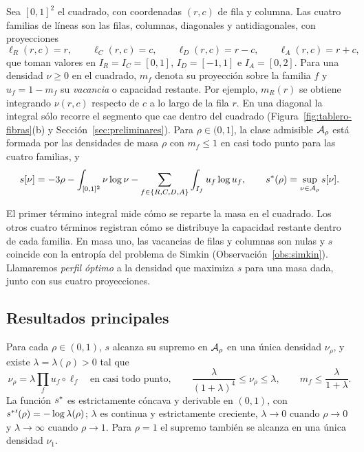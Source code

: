 Sea $[0,1]^2$ el cuadrado, con coordenadas $(r,c)$ de fila y columna. Las cuatro familias de líneas
son las filas, columnas, diagonales y antidiagonales, con proyecciones
\[
 \ell_R(r,c)=r,\qquad \ell_C(r,c)=c,\qquad \ell_D(r,c)=r-c,\qquad \ell_A(r,c)=r+c,
\]
que toman valores en $I_R=I_C=[0,1]$, $I_D=[-1,1]$ e $I_A=[0,2]$. Para una densidad $\nu\ge0$ en
el cuadrado, $m_f$ denota su proyección sobre la familia $f$ y $u_f=1-m_f$ su \emph{vacancia}
o capacidad restante. Por ejemplo, $m_R(r)$ se obtiene integrando $\nu(r,c)$ respecto de $c$ a lo largo de la fila $r$.
En una diagonal la integral sólo recorre el segmento que cae dentro del cuadrado
(Figura~\ref{fig:tablero-fibras}(b) y Sección~\ref{sec:preliminares}). Para $\rho\in(0,1]$, la clase admisible ${\mathcal{A}}_\rho$ está formada por
las densidades de masa $\rho$ con $m_f\le1$ en casi todo punto para las cuatro familias, y
\begin{equation}\label{eq:funcional}
 s[\nu]=-3\rho-\int_{[0,1]^2}\nu\log\nu-\sum_{f\in\{R,C,D,A\}}\int_{I_f}u_f\log u_f,\qquad
 s^{*}(\rho)=\sup_{\nu\in{\mathcal{A}}_\rho}s[\nu].
\end{equation}

El primer término integral mide cómo se reparte la masa en el cuadrado. Los otros cuatro
términos registran cómo se distribuye la capacidad restante dentro de cada
familia. En masa uno, las vacancias de filas y columnas son nulas y $s$ coincide con la
entropía del problema de Simkin (Observación~\ref{obs:simkin}). Llamaremos \emph{perfil óptimo} a la densidad que maximiza $s$
para una masa dada, junto con sus cuatro proyecciones.

\subsection{Resultados principales}

\begin{teorema}\label{thm:euler}
Para cada $\rho\in(0,1)$, $s$ alcanza su supremo en ${\mathcal{A}}_\rho$ en una única densidad $\nu_\rho$, y
existe $\lambda=\lambda(\rho)>0$ tal que
\[
 \nu_\rho=\lambda\prod_f u_f\circ\ell_f\quad\text{en casi todo punto},\qquad
 \frac{\lambda}{(1+\lambda)^4}\le\nu_\rho\le\lambda,\qquad m_f\le\frac{\lambda}{1+\lambda}.
\]
La función $s^{*}$ es estrictamente cóncava y derivable en $(0,1)$, con $s^{*}{}'(\rho)=-\log\lambda(\rho)$;
$\lambda$ es continua y estrictamente creciente, $\lambda\to0$ cuando $\rho\to0$ y $\lambda\to\infty$
cuando $\rho\to1$. Para $\rho=1$ el supremo también se alcanza en una única densidad $\nu_1$.
\end{teorema}

